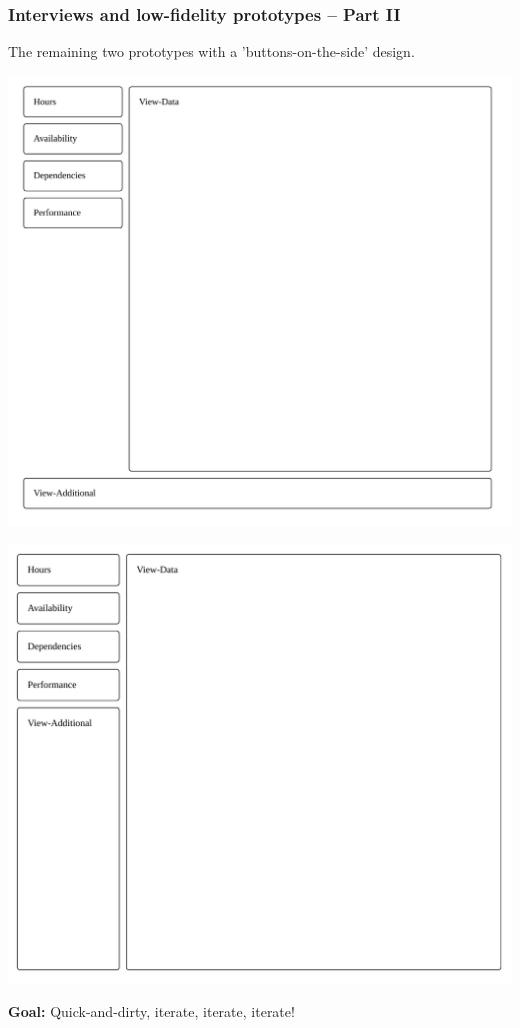 \documentclass[xcolor=svgnames,10pt,aspectratio=1610]{beamer}
\begin{document}
\begin{frame}
  \frametitle{Interviews and low-fidelity prototypes -- Part II}
  The remaining two prototypes with a 'buttons-on-the-side' design.
  \begin{minipage}{\textwidth}
    \begin{minipage}{0.49\textwidth}
      \centering
      \includegraphics[width=1.\textwidth]{../msccls/ui13.pdf}
    \end{minipage}
    \begin{minipage}{0.49\textwidth}
      \centering
      \vspace{-0.11cm}
      \hspace{-0.5cm}
      \includegraphics[width=1.\textwidth]{../msccls/ui14.pdf}
    \end{minipage}
  \end{minipage}
  \textbf{Goal:} Quick-and-dirty, iterate, iterate, iterate!
\end{frame}
\end{document}
